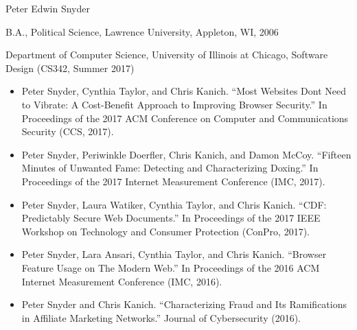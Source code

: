 \vita
\begin{singlespace}
    \begin{description}[labelwidth=4cm,leftmargin=4.2cm,itemsep=1em]

        \item[NAME] Peter Edwin Snyder

        \item[EDUCATION] B.A., Political Science, Lawrence University, Appleton, WI, 2006

        \item[TEACHING] Department of Computer Science, University of Illinois at Chicago, Software Design (CS342, Summer 2017)

        \item[PUBLICATIONS]
            \begin{itemize}[label={},listparindent=0pt,itemindent=0pt,leftmargin=0pt,itemsep=1em,parsep=0pt,topsep=0pt,partopsep=0pt]
                \item Peter Snyder, Cynthia Taylor, and Chris Kanich. %
                ``Most Websites Dont Need to Vibrate: A Cost-Benefit Approach to Improving Browser Security.'' %
                In Proceedings of the 2017 ACM Conference on Computer and Communications Security (CCS, 2017).

                \item Peter Snyder, Periwinkle Doerfler, Chris Kanich, and Damon McCoy. %
                ``Fifteen Minutes of Unwanted Fame: Detecting and Characterizing Doxing.'' %
                In Proceedings of the 2017 Internet Measurement Conference (IMC, 2017).

                \item Peter Snyder, Laura Watiker, Cynthia Taylor, and Chris Kanich. %
                ``CDF: Predictably Secure Web Documents.'' %
                In Proceedings of the 2017 IEEE Workshop on Technology and Consumer Protection (ConPro, 2017).

                \item Peter Snyder, Lara Ansari, Cynthia Taylor, and Chris Kanich. %
                ``Browser Feature Usage on The Modern Web.'' %
                In Proceedings of the 2016 ACM Internet Measurement Conference (IMC, 2016).

                \item Peter Snyder and Chris Kanich. %
                ``Characterizing  Fraud  and  Its  Ramifications  in  Affiliate  Marketing  Networks.'' %
                Journal of Cybersecurity (2016).


\end{itemize}
\end{description}
\end{singlespace}
